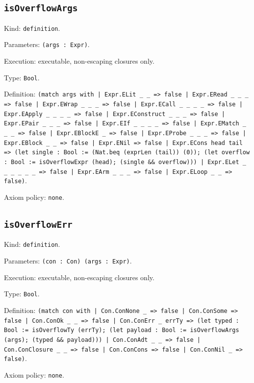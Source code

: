 \documentclass[11pt]{article}
\begin{document}
\subsection*{\texttt{isOverflowArgs}}
\noindent Kind: \texttt{definition}.\par
\noindent Parameters: \texttt{(args : Expr)}.\par
\noindent Execution: executable, non-escaping closures only.\par
\noindent Type: \texttt{Bool}.\par
\noindent Definition: \texttt{(match args with | Expr.ELit \_ \_ => false | Expr.ERead \_ \_ \_ => false | Expr.EWrap \_ \_ \_ => false | Expr.ECall \_ \_ \_ \_ => false | Expr.EApply \_ \_ \_ \_ => false | Expr.EConstruct \_ \_ \_ => false | Expr.EPair \_ \_ \_ => false | Expr.EIf \_ \_ \_ \_ => false | Expr.EMatch \_ \_ \_ => false | Expr.EBlockE \_ => false | Expr.EProbe \_ \_ \_ => false | Expr.EBlock \_ \_ => false | Expr.ENil => false | Expr.ECons head tail => (let single : Bool := (Nat.beq (exprLen (tail)) (0)); (let overflow : Bool := isOverflowExpr (head); (single \&\& overflow))) | Expr.ELet \_ \_ \_ \_ \_ \_ => false | Expr.EArm \_ \_ \_ => false | Expr.ELoop \_ \_ => false)}.\par
\noindent Axiom policy: \texttt{none}.\par
\subsection*{\texttt{isOverflowErr}}
\noindent Kind: \texttt{definition}.\par
\noindent Parameters: \texttt{(con : Con) (args : Expr)}.\par
\noindent Execution: executable, non-escaping closures only.\par
\noindent Type: \texttt{Bool}.\par
\noindent Definition: \texttt{(match con with | Con.ConNone \_ => false | Con.ConSome => false | Con.ConOk \_ \_ => false | Con.ConErr \_ errTy => (let typed : Bool := isOverflowTy (errTy); (let payload : Bool := isOverflowArgs (args); (typed \&\& payload))) | Con.ConAdt \_ \_ => false | Con.ConClosure \_ \_ => false | Con.ConCons => false | Con.ConNil \_ => false)}.\par
\noindent Axiom policy: \texttt{none}.\par
\end{document}
